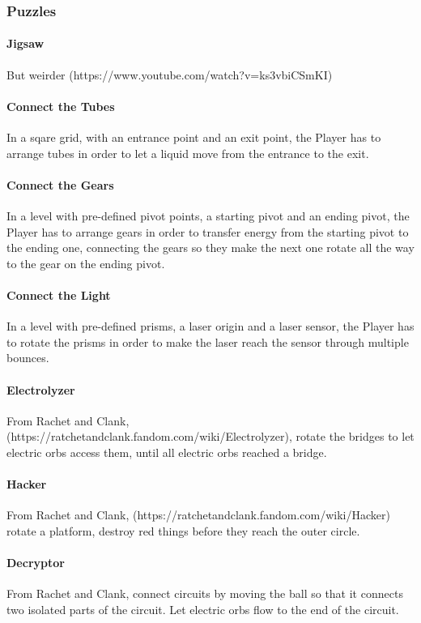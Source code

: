 \subsubsection{Puzzles}

\paragraph{Jigsaw} But weirder (https://www.youtube.com/watch?v=ks3vbiCSmKI)

\paragraph{Connect the Tubes} In a sqare grid, with an entrance point and an exit point, the Player has to arrange tubes in order to let a liquid move from the entrance to the exit.

\paragraph{Connect the Gears} In a level with pre-defined pivot points, a starting pivot and an ending pivot, the Player has to arrange gears in order to transfer energy from the starting pivot to the ending one, connecting the gears so they make the next one rotate all the way to the gear on the ending pivot.

\paragraph{Connect the Light} In a level with pre-defined prisms, a laser origin and a laser sensor, the Player has to rotate the prisms in order to make the laser reach the sensor through multiple bounces.

\paragraph{Electrolyzer} From Rachet and Clank, (https://ratchetandclank.fandom.com/wiki/Electrolyzer), rotate the bridges to let electric orbs access them, until all electric orbs reached a bridge.

\paragraph{Hacker} From Rachet and Clank, (https://ratchetandclank.fandom.com/wiki/Hacker) rotate a platform, destroy red things before they reach the outer circle.

\paragraph{Decryptor} From Rachet and Clank, connect circuits by moving the ball so that it connects two isolated parts of the circuit. Let electric orbs flow to the end of the circuit.

